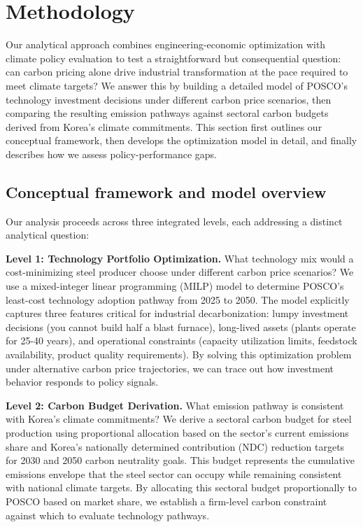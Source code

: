 \section{Methodology}

Our analytical approach combines engineering-economic optimization with climate policy evaluation to test a straightforward but consequential question: can carbon pricing alone drive industrial transformation at the pace required to meet climate targets? We answer this by building a detailed model of POSCO's technology investment decisions under different carbon price scenarios, then comparing the resulting emission pathways against sectoral carbon budgets derived from Korea's climate commitments. This section first outlines our conceptual framework, then develops the optimization model in detail, and finally describes how we assess policy-performance gaps.

\subsection{Conceptual framework and model overview}

Our analysis proceeds across three integrated levels, each addressing a distinct analytical question:

\textbf{Level 1: Technology Portfolio Optimization.} What technology mix would a cost-minimizing steel producer choose under different carbon price scenarios? We use a mixed-integer linear programming (MILP) model to determine POSCO's least-cost technology adoption pathway from 2025 to 2050. The model explicitly captures three features critical for industrial decarbonization: lumpy investment decisions (you cannot build half a blast furnace), long-lived assets (plants operate for 25-40 years), and operational constraints (capacity utilization limits, feedstock availability, product quality requirements). By solving this optimization problem under alternative carbon price trajectories, we can trace out how investment behavior responds to policy signals.

\textbf{Level 2: Carbon Budget Derivation.} What emission pathway is consistent with Korea's climate commitments? We derive a sectoral carbon budget for steel production using proportional allocation based on the sector's current emissions share and Korea's nationally determined contribution (NDC) reduction targets for 2030 and 2050 carbon neutrality goals. This budget represents the cumulative emissions envelope that the steel sector can occupy while remaining consistent with national climate targets. By allocating this sectoral budget proportionally to POSCO based on market share, we establish a firm-level carbon constraint against which to evaluate technology pathways.

